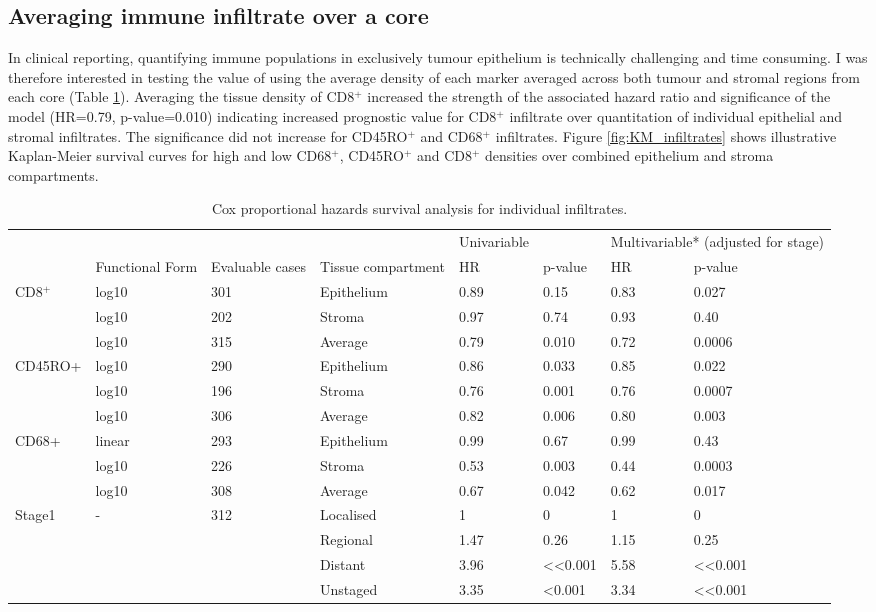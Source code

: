 \subsection{Averaging immune infiltrate over a core}

In clinical reporting, quantifying immune populations in exclusively tumour epithelium is technically challenging and time consuming. I was therefore interested in testing the value of using the average density of each marker averaged across both tumour and stromal regions from each core (Table \ref{tab:coxsurv}).  Averaging the tissue density of CD8$^+$ increased the strength of the associated hazard ratio and significance of the model (HR=0.79, p-value=0.010) indicating increased prognostic value for CD8$^+$ infiltrate over quantitation of individual epithelial and stromal infiltrates. The significance did not increase for CD45RO$^+$ and CD68$^+$ infiltrates.  Figure \ref{fig:KM_infiltrates} shows illustrative Kaplan-Meier survival curves for high and low CD68$^+$, CD45RO$^+$ and CD8$^+$ densities over combined epithelium and stroma compartments.\\


\begin{landscape}
\begin{table}[]
    \centering
    \begin{tabular}{llllllll}
    
		& & &&		Univariable && \multicolumn{2}{c}{	Multivariable* 
(adjusted for stage)} \\
								
&	Functional Form &	Evaluable cases&	Tissue compartment&	HR &	p-value	& HR &	p-value	\\ \hline
CD8$^+$&	log10 &	301	&Epithelium&	0.89&	0.15&	0.83&	0.027\\	
&	log10&	202&	Stroma&	0.97&	0.74&	0.93&	0.40\\	
&	log10&	315&	Average&	0.79&	0.010&	0.72&	0.0006\\	
CD45RO+&	log10&	290&	Epithelium&	0.86&	0.033&	0.85&	0.022\\	
	&log10&	196&	Stroma&	0.76&	0.001&	0.76&	0.0007\\	
	&log10&	306&	Average&	0.82&	0.006&	0.80&	0.003\\	
CD68+&	linear&	293&	Epithelium&	0.99&	0.67&	0.99&	0.43\\	
&	log10&	226	&Stroma	&0.53&	0.003&	0.44&	0.0003	\\
&	log10&	308	&Average&	0.67&	0.042&	0.62&	0.017\\	
Stage1 & - &	312&	Localised&	1&	0&	1&	0	\\
	& & &		Regional&	1.47&	0.26&	1.15&	0.25\\	
	&	&&	Distant	&3.96&	<<0.001&	5.58&	<<0.001	\\
	&	&&	Unstaged&	3.35&	<0.001&	3.34&	<<0.001	\\ \hline

\end{tabular}
    \caption[Individual immune infiltrates Cox regression]{Cox proportional hazards survival analysis for individual infiltrates.}
    \label{tab:coxsurv}
\end{table}
\end{landscape}

